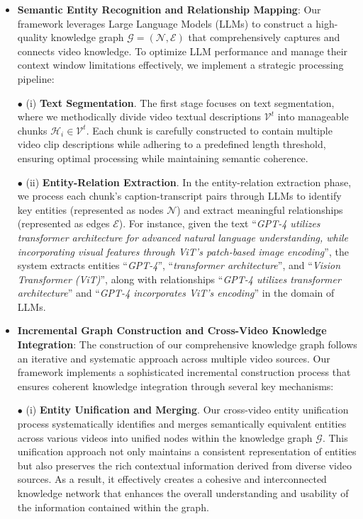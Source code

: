 \begin{itemize}[leftmargin=*]
    \item \textbf{Semantic Entity Recognition and Relationship Mapping}:
    Our framework leverages Large Language Models (LLMs) to construct a high-quality knowledge graph $\mathcal{G} = (\mathcal{N}, \mathcal{E})$ that comprehensively captures and connects video knowledge. To optimize LLM performance and manage their context window limitations effectively, we implement a strategic processing pipeline: \\\vspace{-0.12in}
    
    $\bullet$ (i) \textbf{Text Segmentation}. The first stage focuses on text segmentation, where we methodically divide video textual descriptions $\mathcal{V}^{t}$ into manageable chunks $\mathcal{H}_i \in \mathcal{V}^{t}$. Each chunk is carefully constructed to contain multiple video clip descriptions while adhering to a predefined length threshold, ensuring optimal processing while maintaining semantic coherence. \\\vspace{-0.12in}

    $\bullet$ (ii) \textbf{Entity-Relation Extraction}. In the entity-relation extraction phase, we process each chunk's caption-transcript pairs through LLMs to identify key entities (represented as nodes $\mathcal{N}$) and extract meaningful relationships (represented as edges $\mathcal{E}$). For instance, given the text ``\textit{GPT-4 utilizes transformer architecture for advanced natural language understanding, while incorporating visual features through ViT's patch-based image encoding}'', the system extracts entities ``\textit{GPT-4}'', ``\textit{transformer architecture}'', and ``\textit{Vision Transformer (ViT)}'', along with relationships ``\textit{GPT-4 utilizes transformer architecture}'' and ``\textit{GPT-4 incorporates ViT's encoding}'' in the domain of LLMs.

    \item \textbf{Incremental Graph Construction and Cross-Video Knowledge Integration}:
    The construction of our comprehensive knowledge graph follows an iterative and systematic approach across multiple video sources. Our framework implements a sophisticated incremental construction process that ensures coherent knowledge integration through several key mechanisms:

    $\bullet$ (i) \textbf{Entity Unification and Merging}. Our cross-video entity unification process systematically identifies and merges semantically equivalent entities across various videos into unified nodes within the knowledge graph $\mathcal{G}$. This unification approach not only maintains a consistent representation of entities but also preserves the rich contextual information derived from diverse video sources. As a result, it effectively creates a cohesive and interconnected knowledge network that enhances the overall understanding and usability of the information contained within the graph. \\\vspace{-0.12in}


\end{itemize}
